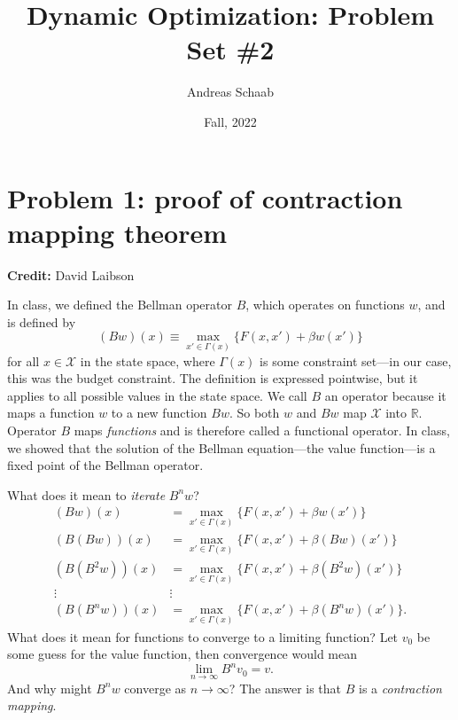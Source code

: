 \documentclass[11pt]{extarticle}
\title{Dynamic Optimization: Problem Set \#2}
\author{Andreas Schaab}
\date{Fall, 2022}
\theoremstyle{plain}
\theoremstyle{definition}
\begin{document}
\maketitle
\thispagestyle{empty}
\setcounter{page}{0}


\vspace{10mm}
\section*{Problem 1: proof of contraction mapping theorem}

\textbf{Credit:} David Laibson


\vspace{5mm}
\noindent
In class, we defined the Bellman operator $B$, which operates on functions $w$, and is defined by
\begin{equation*}
	(Bw)(x) \equiv \max_{x' \in \Gamma(x)} \bigg\{ F(x, x') + \beta w(x') \bigg\}
\end{equation*}
for all $x \in \mathcal X$ in the state space, where $\Gamma(x)$ is some constraint set---in our case, this was the budget constraint. The definition is expressed pointwise, but it applies to all possible values in the state space. We call $B$ an operator because it maps a function $w$ to a new function $Bw$. So both $w$ and $Bw$ map $\mathcal X$ into $\mathbb R$. Operator $B$ maps \textit{functions} and is therefore called a functional operator. In class, we showed that the solution of the Bellman equation---the value function---is a fixed point of the Bellman operator.

What does it mean to \textit{iterate} $B^n w$?
\begin{align*}
	(Bw) (x) &= \max_{x' \in \Gamma(x)} \bigg\{ F(x, x') + \beta w(x') \bigg\} \\
	(B(Bw)) (x) &= \max_{x' \in \Gamma(x)} \bigg\{ F(x, x') + \beta (Bw)(x') \bigg\} \\
	(B(B^2w)) (x) &= \max_{x' \in \Gamma(x)} \bigg\{ F(x, x') + \beta (B^2w)(x') \bigg\} \\
	\vdots & \vdots  \\
	(B(B^nw)) (x) &= \max_{x' \in \Gamma(x)} \bigg\{ F(x, x') + \beta (B^nw)(x') \bigg\}.
\end{align*}
What does it mean for functions to converge to a limiting function? Let $v_0$ be some guess for the value function, then convergence would mean
\begin{equation*}
	\lim_{n \to \infty} B^n v_0 = v.
\end{equation*}
And why might $B^n w$ converge as $n \to \infty$? The answer is that $B$ is a \textit{contraction mapping}.
\end{document}
